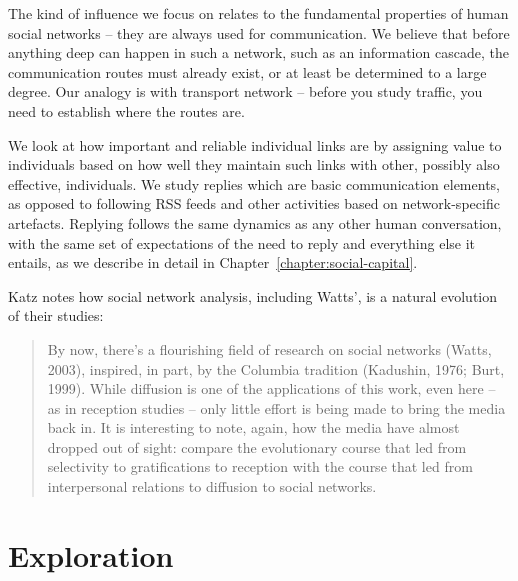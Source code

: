 \documentclass[10pt,oneside]{memoir}
\begin{document}
\begin{Spacing}{2}
The kind of influence we focus on relates to the fundamental properties of human social networks -- they are always used for communication.   We believe that before anything deep can happen in such a network, such as an information cascade, the communication routes must already exist, or at least be determined to a large degree.  Our analogy is with transport network -- before you study traffic, you need to establish where the routes are.


We look at how important and reliable individual links are by assigning value to individuals based on how well they maintain such links with other, possibly also effective, individuals.  We study replies which are basic communication elements, as opposed to following RSS feeds and other activities based on network-specific artefacts.  Replying follows the same dynamics as any other human conversation, with the same set of expectations of the need to reply and everything else it entails, as we describe in detail in Chapter~\ref{chapter:social-capital}. 


Katz notes how social network analysis, including Watts', is a natural evolution of their studies:


\begin{quote}
By now, there's a flourishing field of research on social networks (Watts, 2003), inspired, in part, by the Columbia tradition (Kadushin, 1976; Burt, 1999).  While diffusion is one of the applications of this work, even here -- as in reception studies -- only little effort is being made to bring the media back in.  It is interesting to note, again, how the media have almost dropped out of sight: compare the evolutionary  course that led from selectivity to gratifications to reception with the course that led from interpersonal relations to diffusion to social networks.
\end{quote}


\pagebreak \chapter{Exploration}
\label{exploration}

\label{chapter:exploration}



\end{Spacing}
\end{document}
